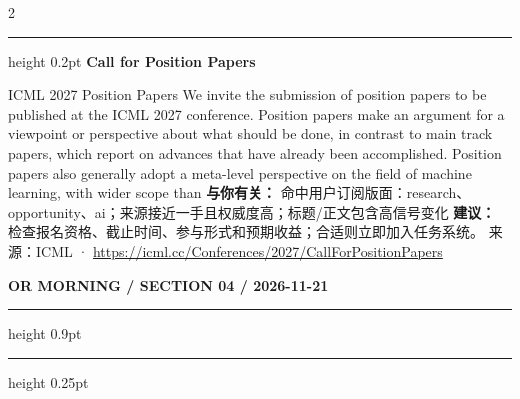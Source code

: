 \documentclass[10.5pt]{ctexart}
\begin{document}
\begin{multicols}{2}
\vspace{2mm}
\hrule height 0.2pt
\vspace{2mm}
{\large\bfseries Call for Position Papers}\par
ICML 2027 Position Papers We invite the submission of position papers to be published at the ICML 2027 conference. Position papers make an argument for a viewpoint or perspective about what should be done, in contrast to main track papers, which report on advances that have already been accomplished. Position papers also generally adopt a meta-level perspective on the field of machine learning, with wider scope than 
\textbf{与你有关：} 命中用户订阅版面：research、opportunity、ai；来源接近一手且权威度高；标题/正文包含高信号变化
\textbf{建议：} 检查报名资格、截止时间、参与形式和预期收益；合适则立即加入任务系统。
{\footnotesize\color{ormuted} 来源：ICML · \url{https://icml.cc/Conferences/2027/CallForPositionPapers}}
\end{multicols}
\newpage
{\small\bfseries OR MORNING / SECTION 04 / 2026-11-21}
\vspace{2mm}
\hrule height 0.9pt
\vspace{1.5mm}
\hrule height 0.25pt
\vspace{4mm}
\end{document}
